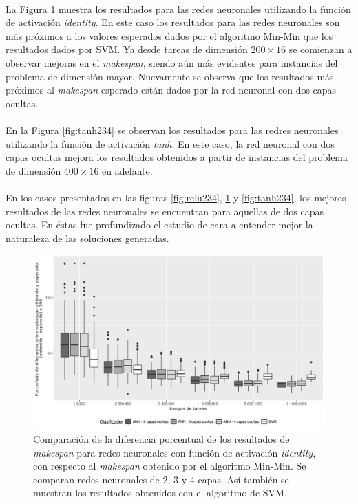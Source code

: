\paragraph{}La Figura \ref{fig:identity234} muestra los resultados para las redes neuronales utilizando la función de activación \textit{identity}. En este caso los resultados para las redes neuronales son más próximos a los valores esperados dados por el algoritmo Min-Min que los resultados dados por SVM. Ya desde tareas de dimensión $ 200 \times 16$ se comienzan a observar mejoras en el \textit{makespan}, siendo aún más evidentes para instancias del problema de dimensión mayor. Nuevamente se observa que los resultados más próximos al \textit{makespan} esperado están dados por la red neuronal con dos capas ocultas. 

\paragraph{}En la Figura \ref{fig:tanh234} se observan los resultados para las redres neuronales utilizando la función de activación \textit{tanh}. En este caso, la red neuronal con dos capas ocultas mejora los resultados obtenidos a partir de instancias del problema de dimensión $ 400 \times 16$ en adelante. 

\paragraph{}En los casos presentados en las figuras \ref{fig:relu234}, \ref{fig:identity234} y \ref{fig:tanh234}, los mejores resultados de las redes neuronales se encuentran para aquellas de dos capas ocultas. En éstas fue profundizado el estudio de cara a entender mejor la naturaleza de las soluciones generadas. 

\begin{figure}[H]
  \centering
  \includegraphics[width=\columnwidth]{imagenes/comparacion_anns_identity.png}
  \caption{Comparación de  la diferencia porcentual  de los resultados de \textit{makespan} para redes neuronales con función de activación \textit{identity}, con respecto al \textit{makespan} obtenido por el algoritmo Min-Min. Se comparan redes neuronales de 2, 3 y 4 capas. Así también se muestran los resultados obtenidos con el algoritmo de SVM.}
  \label{fig:identity234}
\end{figure}

